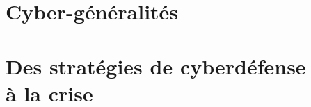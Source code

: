 %
%



\part{Cyber-généralités}





%


\part[Sécurité opérationnelle]{Des stratégies de cyberdéfense \\à la crise}


